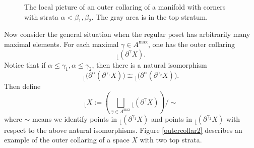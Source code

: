 \documentclass[reqno, 10pt]{amsart}
\numberwithin{equation}{section}
\numberwithin{equation}{section}
\theoremstyle{definition}
\theoremstyle{remark}
\newcommand{\beqn}{\begin{equation*}}
\newcommand{\eeqn}{\end{equation*}}
\renewcommand{\outer}{{}_{\lfloor}}
\begin{document}
\begin{center}
\begin{figure}[h]
\caption{The local picture of an outer collaring of a manifold with corners with strata $\alpha < \beta_1, \beta_2$. The gray area is in the top stratum.}\label{outercollar}
\end{figure}
\end{center}




Now consider the general situation when the regular poset has arbitrarily many maximal elements. For each maximal $\gamma \in A^{\max}$, one has the outer collaring
\beqn
\outer (\partial^\gamma X).
\eeqn
Notice that if $\alpha \leq \gamma_1, \alpha \leq \gamma_2$, then there is a natural isomorphism 
\beqn
\outer \big( \partial^\alpha( \partial^{\gamma_1} X) \big) \cong \outer \big( \partial^\alpha ( \partial^{\gamma_2} X) \big).
\eeqn
Then define 
\beqn
\outer X:= \left( \bigsqcup_{\gamma \in A^{\max}} \outer (\partial^\gamma X) \right)/ \sim
\eeqn
where $\sim$ means we identify points in $\outer (\partial^{\gamma_1} X)$ and points in $\outer (\partial^{\gamma_2} X)$ with respect to the above natural isomorphisms. Figure \ref{outercollar2} describes an example of the outer collaring of a space $X$ with two top strata. 
\end{document}
